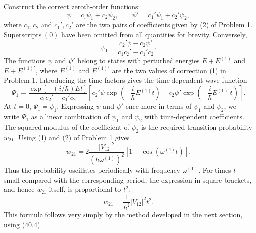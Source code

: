 \SolutionHeading Construct the correct zeroth-order functions:
\[
  \psi=c_1\psi_1+c_2\psi_2,\qquad
  \psi'=c_1'\psi_1+c_2'\psi_2,
\]
where $c_1,c_2$ and $c_1',c_2'$ are the two pairs of coefficients given by
(2) of Problem 1. Superscripts $(0)$ have been omitted from all quantities
for brevity. Conversely,
\[
  \psi_1=\frac{c_2'\psi-c_2\psi'}{c_1c_2'-c_1'c_2}.
\]
The functions $\psi$ and $\psi'$ belong to states with perturbed energies
$E+E^{(1)}$ and $E+E^{(1)'}$, where $E^{(1)}$ and $E^{(1)'}$ are the two
values of correction (1) in Problem 1. Introducing the time factors gives
the time-dependent wave function
\[
  \Psi_1=\frac{\exp[-(i/\hbar)Et]}{c_1c_2'-c_1'c_2}
  \left[c_2'\psi\exp\left(-\frac i\hbar E^{(1)}t\right)
       -c_2\psi'\exp\left(-\frac i\hbar E^{(1)'}t\right)\right].
\]
At $t=0$, $\Psi_1=\psi_1$. Expressing $\psi$ and $\psi'$ once more in terms
of $\psi_1$ and $\psi_2$, we write $\Psi_1$ as a linear combination of
$\psi_1$ and $\psi_2$ with time-dependent coefficients. The squared modulus
of the coefficient of $\psi_2$ is the required transition probability
$w_{21}$. Using (1) and (2) of Problem 1 gives
\[
  w_{21}=2\frac{|V_{12}|^2}{(\hbar\omega^{(1)})^2}
  [1-\cos(\omega^{(1)}t)].
\]
Thus the probability oscillates periodically with frequency
$\omega^{(1)}$. For times $t$ small compared with the corresponding period,
the expression in
square brackets, and hence $w_{21}$ itself, is proportional to $t^2$:
\[
  w_{21}=\frac1{\hbar^2}|V_{12}|^2t^2.
\]
This formula follows very simply by the method developed in the next section,
using (40.4).
